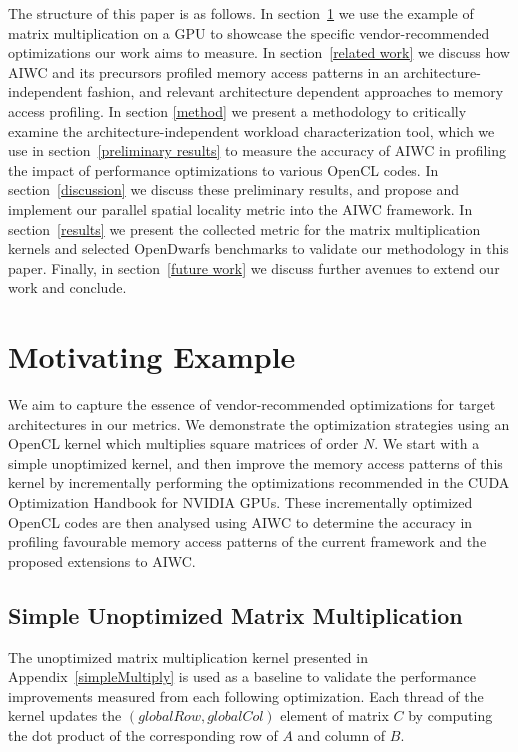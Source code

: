 \documentclass[review=false, sigchi]{acmart}
\begin{document}
	The structure of this paper is as follows.
	In section~\ref{motivating example} we use the example of matrix multiplication on a GPU to showcase the specific vendor-recommended optimizations our work aims to measure.
	In section~\ref{related work} we discuss how AIWC and its precursors profiled memory access patterns in an architecture-independent fashion, and relevant architecture dependent approaches to memory access profiling.
	In section \ref{method} we present a methodology to critically examine the architecture-independent workload characterization tool, which we use in section~\ref{preliminary results} to measure the accuracy of AIWC in profiling the impact of performance optimizations to various OpenCL codes.
	In section~\ref{discussion} we discuss these preliminary results, and propose and implement our parallel spatial locality metric into the AIWC framework.
	In section~\ref{results} we present the collected metric for the matrix multiplication kernels and selected OpenDwarfs benchmarks to validate our methodology in this paper.
	Finally, in section~\ref{future work} we discuss further avenues to extend our work and conclude.
	
	\section{Motivating Example} \label{motivating example}
	
	We aim to capture the essence of vendor-recommended optimizations for target architectures in our metrics.
	We demonstrate the optimization strategies using an OpenCL kernel which multiplies square matrices of order $N$.
	We start with a simple unoptimized kernel, and then improve the memory access patterns of this kernel by incrementally performing the optimizations recommended in the CUDA Optimization Handbook \cite{cudaoptimisation} for NVIDIA GPUs.
	These incrementally optimized OpenCL codes are then analysed using AIWC to determine the accuracy in profiling favourable memory access patterns of the current framework and the proposed extensions to AIWC.
	
	\subsection{Simple Unoptimized Matrix Multiplication}
	
	The unoptimized matrix multiplication kernel presented in Appendix~\ref{simpleMultiply} is used as a baseline to validate the performance improvements measured from each following optimization.
	Each thread of the kernel updates the $(globalRow, globalCol)$ element of matrix $C$ by computing the dot product of the corresponding row of $A$ and column of $B$.
	
\end{document}
